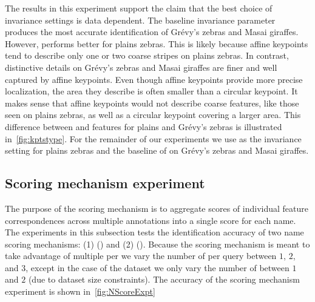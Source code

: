         The results in this experiment support the claim that the best choice of invariance settings is data
          dependent.
        The baseline invariance parameter \AIAlone{} produces the most accurate identification of  Grévy's zebras
          and Masai giraffes.
        However, \QRHCirc{} performs better for plains zebras.
        This is likely because affine keypoints tend to describe only one or two coarse stripes on plains zebras.
        In contrast, distinctive details on Grévy's zebras and Masai giraffes are finer and well captured by
          affine keypoints.
        Even though affine keypoints provide more precise localization, the area they describe is often smaller
          than a circular keypoint.
        It makes sense that affine keypoints would not describe coarse features, like those seen on plains
          zebras, as well as a circular keypoint covering a larger area.
        This difference between \AIAlone{} and  \QRHEll{} features for plains and Grévy's zebras is illustrated
          in~\cref{fig:kptstype}.
        For the remainder of our experiments we use \QRHCirc{} as the invariance setting for plains zebras and
          the baseline of \AIAlone{} on Grévy's zebras and Masai giraffes.

    \subsection{Scoring mechanism experiment}\label{sub:exptscoremech}  

        The purpose of the scoring mechanism is to aggregate scores of individual feature correspondences across
          multiple annotations into a single score for each name.
        The experiments in this subsection tests the identification accuracy of two name scoring mechanisms:
        (1) \cscoring{} (\csum{}) and
        (2) \nscoring{} (\nsum{}).
        Because the scoring mechanism is meant to take advantage of multiple \exemplars{} per \name{} we vary the
          number of \exemplars{} per query between $1$, $2$, and $3$, except in the case of the \girmmasterI{}
          dataset we only vary the number of \exemplars{} between $1$ and $2$ (due to dataset size constraints).
        The accuracy of the scoring mechanism experiment is shown in~\cref{fig:NScoreExpt}

        \NScoreExpt{}

